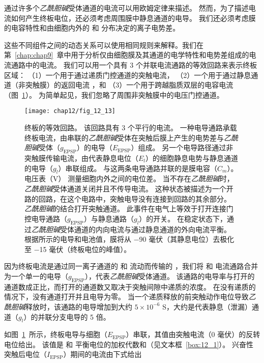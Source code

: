 通过许多个\textit{乙酰胆碱}受体通道的电流可以用欧姆定律来描述。
然而，为了描述电流如何产生终板电位，还必须考虑周围膜中静息通道的电导。
我们还必须考虑膜的电容特性和由细胞内外的  和  分布决定的离子电势差。


这些不同组件之间的动态关系可以使用相同规则来解释。我们在第~\ref{chap:chap9}~章中用于分析仅由细胞膜及其通道的电学特性和电势差组成的电流通路中的电流。
我们可以用一个具有 3 个并联电流通路的等效回路来表示终板区域：
（1）一个用于通过递质门控通道的突触电流，
（2）一个用于通过静息通道（非突触膜）的返回电流 ，和
（3）一个用于跨越脂质双层的电容电流（图~\ref{fig:12_13}）。
为简单起见，我们忽略了周围非突触膜中的电压门控通道。


\begin{figure}[htbp]
	\centering
	\texttt{[image: chap12/fig\_12\_13]}
	\caption{终板的等效回路。
		该回路具有 3 个平行的电流。
		一种电导通路承载终板电流，由串联的\textit{乙酰胆碱}受体在突触后膜上产生的电势差与\textit{乙酰胆碱}受体（$ g_{\text{EPSP}} $）的电导（$E_{\text{EPSP}}$）组成。
		另一个电导路径通过非突触膜传输电流，由代表静息电位（$ E_l $）的细胞静息电势与静息通道的电导（$ g_l $）串联组成。
		与这两条电导通路并联的是膜电容（$ C_m $）。
		电压表（V） 测量细胞内外之间的电位差。
		当不存在\textit{乙酰胆碱}时，\textit{乙酰胆碱}受体通道关闭并且不传导电流。
		这种状态被描述为一个开路的回路，在这个电路中，突触电导没有连接到回路的其余部分。
		\textit{乙酰胆碱}的结合打开突触通道。
		此事件在电气上等效于打开连接门控电导通路（$ g_{\text{EPSP}} $）与静息通路（$ g_l $）的开关。
		在稳定状态下，通过\textit{乙酰胆碱}受体通道的内向电流与通过静息通道的外向电流平衡。
		根据所示的电导和电池值，膜将从 −90 毫伏（其静息电位）去极化至 −15 毫伏（终板电位的峰值）。}
	\label{fig:12_13}
\end{figure}


因为终板电流是通过同一离子通道的  和 流动而传输的 ，我们将  和  电流通路合并为一个单一的电导（$ g_{\text{EPSP}} $），代表\textit{乙酰胆碱}受体通道。
该通路的电导率与打开的通道数成正比，而打开的通道数又取决于突触间隙中递质的浓度。
在没有递质的情况下，没有通道打开并且电导为零。
当一个递质释放的前突触动作电位导致\textit{乙酰胆碱}释放时，该通路的电导增加到大约 $ 5 \times 10^{-6} $ S，大约是代表静息（泄漏）通道（$ g_l $）的并联分支电导的 5 倍。


如图~\ref{fig:12_13}~所示，终板电导与细胞（$E_{\text{EPSP}}$）串联，其值由突触电流（0 毫伏）的反转电位给出。
该值是  和  平衡电位的加权代数和（见文本框~\ref{box:12_1}）。
兴奋性突触后电位（$I_{\text{EPSP}}$）期间的电流由下式给出


